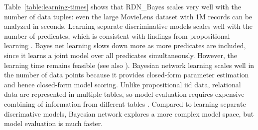\documentclass[runningheads,a4paper]{llncs}
\begin{document}
%  

Table~\ref{table:learning-times} shows that RDN\_Bayes scales very well with the number of data tuples: even the large MovieLens dataset with 1M records can be analyzed in seconds. Learning separate discriminative models  scales well with the number of predicates, which is consistent with findings from  propositional learning \cite{Heckerman2000}. Bayes net learning slows down more as more predicates are included, since it learns a joint model over all predicates simultaneously. However, the learning time remains feasible (see also \cite{Schulte2012}). Bayesian network learning scales well in the number of data points because it provides closed-form parameter estimation and hence closed-form model scoring. Unlike propositional iid data, relational data are represented in multiple tables, so model evaluation requires expensive combining of information from different tables \cite{Neville2007}. Compared to learning separate discrimative models, Bayesian network explores a more complex model space, but  model evaluation is much faster. 
\end{document}
